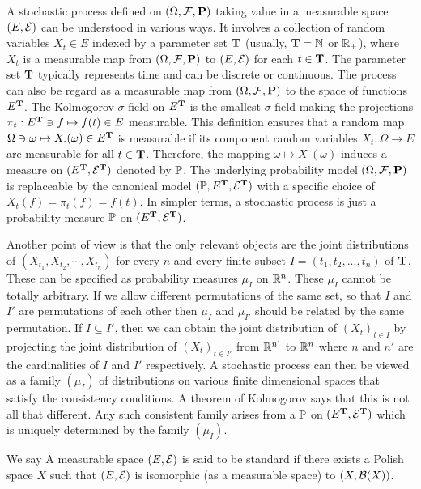 A stochastic process defined on $(\Omega, {\mathcal F}, {\mathbf P})$ taking value in a measurable space $(E, {\mathcal E})$ can be understood in various ways. It involves a collection of random variables $X_t\in E$ indexed by a parameter set ${\mathbf T}$ (usually, ${\mathbf T}={\mathbb N}$ or ${\mathbb R}_+$), where $X_t$ is a measurable map from $(\Omega, {\mathcal F},{\mathbf P})$ to $(E, {\mathcal E})$ for each $t\in {\mathbf T}$. The parameter set ${\mathbf T}$ typically represents time and can be discrete or continuous. The process can also be regard as a measurable map from $(\Omega, {\mathcal F}, {\mathbf P})$ to the space of functions $E^{\mathbf T}$. The Kolmogorov $\sigma$-field on $E^{{\mathbf T}}$ is the smallest $\sigma$-field making the projections $\pi_t: E^{{\mathbf T}} \ni f\mapsto f(t)\in E$ measurable. This definition ensures that a random map  $\Omega \ni \omega \mapsto X_{\cdot}(\omega) \in E^{{\mathbf T}}$ is measurable if its component random variables $X_t:\Omega \to E$ are measurable for all $t\in {\mathbf T}$. Therefore, the mapping $\omega\mapsto X_{\cdot}(\omega)$ induces a measure on $(E^{{\mathbf T}}, {\mathcal E}^{{\mathbf T}})$ denoted by ${\mathbb P}$. The underlying probability model $(\Omega, {\mathcal F}, {\mathbf P})$ is replaceable by the canonical model $({\mathbb P}, E^{{\mathbf T}}, {\mathcal E}^{{\mathbf T}})$ with a specific choice of $X_t(f)=\pi_t(f)=f(t)$. In simpler terms, a stochastic process is just a probability measure ${\mathbb P}$ on $(E^{{\mathbf T}}, {\mathcal E}^{{\mathbf T}})$.
	
Another point of view is that the only relevant objects are the joint distributions of $(X_{t_1}, X_{t_2}, \cdots , X_{t_n})$ for every $n$ and every finite subset $I = (t_1, t_2, ... , t_n)$ of ${\mathbf T}$. These can be specified as probability measures $\mu_{I}$ on ${\mathbb R}^n$. These $\mu_{I}$ cannot be totally arbitrary. If we allow different permutations of the same set, so that $I$ and $I'$ are permutations of each other then $\mu_I$ and $\mu_{I'}$ should be related by the same permutation. If $I\subseteq I'$, then we can obtain the joint distribution of $(X_t)_{t\in I}$ by projecting the joint distribution of $(X_t)_{t\in I'}$ from ${\mathbb R}^{n'}$ to ${\mathbb R}^{n}$ where $n$ and $n'$ are the cardinalities of $I$ and $I'$ respectively. A stochastic process can then be viewed as a family $(\mu_I)$ of distributions on various finite dimensional spaces that satisfy the consistency conditions. A theorem of Kolmogorov says that this is not all that different. Any such consistent family arises from a ${\mathbb P}$ on $(E^{{{\mathbf T}}} , {\mathcal E}^{{\mathbf T}})$ which is uniquely determined by the family $(\mu_I)$.

\begin{definition}
    We say A measurable space \((E, {\mathcal E})\) is said to be standard if there exists a Polish space \(X\) such that \((E,{\mathcal E})\) is isomorphic (as a measurable space) to \((X,{\mathcal B}(X))\). 
\end{definition}

